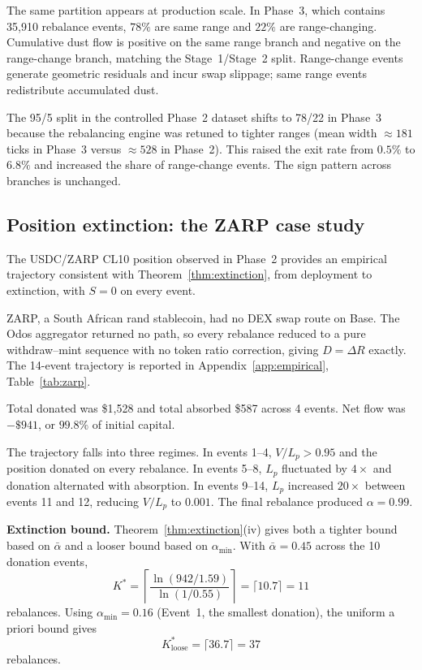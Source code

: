 \documentclass{manuscript}
\begin{document}
The same partition appears at production scale. In Phase~3, which contains 35{,}910 rebalance events, $78\%$ are same range and $22\%$ are range-changing. Cumulative dust flow is positive on the same range branch and negative on the range-change branch, matching the Stage~1/Stage~2 split. Range-change events generate geometric residuals and incur swap slippage; same range events redistribute accumulated dust.

The 95/5 split in the controlled Phase~2 dataset shifts to 78/22 in Phase~3 because the rebalancing engine was retuned to tighter ranges (mean width $\approx 181$ ticks in Phase~3 versus $\approx 528$ in Phase~2). This raised the exit rate from $0.5\%$ to $6.8\%$ and increased the share of range-change events. The sign pattern across branches is unchanged.

\subsection{Position extinction: the ZARP case study}\label{sec:zarp}

The USDC/ZARP CL10 position observed in Phase~2 provides an empirical trajectory consistent with Theorem~\ref{thm:extinction}, from deployment to extinction, with $S = 0$ on every event.

ZARP, a South African rand stablecoin, had no DEX swap route on Base. The Odos aggregator returned no path, so every rebalance reduced to a pure withdraw--mint sequence with no token ratio correction, giving $D = \Delta R$ exactly. The 14-event trajectory is reported in Appendix~\ref{app:empirical}, Table~\ref{tab:zarp}.

Total donated was \$1{,}528 and total absorbed \$587 across 4 events. Net flow was $-\$941$, or $99.8\%$ of initial capital.

The trajectory falls into three regimes. In events 1--4, $V/L_p > 0.95$ and the position donated on every rebalance. In events 5--8, $L_p$ fluctuated by $4\times$ and donation alternated with absorption. In events 9--14, $L_p$ increased $20\times$ between events 11 and 12, reducing $V/L_p$ to $0.001$. The final rebalance produced $\alpha = 0.99$.

\textbf{Extinction bound.} Theorem~\ref{thm:extinction}(iv) gives both a tighter bound based on $\bar\alpha$ and a looser bound based on $\alpha_{\min}$. With $\bar\alpha = 0.45$ across the 10 donation events,
\[
K^* = \left\lceil \frac{\ln(942/1.59)}{\ln(1/0.55)} \right\rceil = \lceil 10.7 \rceil = 11
\]
rebalances. Using $\alpha_{\min} = 0.16$ (Event~1, the smallest donation), the uniform a priori bound gives
\[
K_{\text{loose}}^* = \lceil 36.7 \rceil = 37
\]
rebalances.
\end{document}
